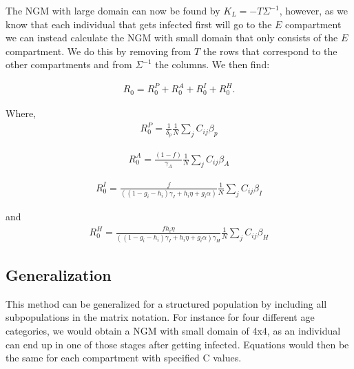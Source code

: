 \documentclass{article}
\begin{document}
The NGM with large domain can now be found by $K_L = - T \Sigma^{-1}$, however, as we know that each individual that gets infected first will go to the $E$ compartment we can instead calculate the NGM with small domain that only consists of the $E$ compartment.
We do this by removing from $T$ the rows that correspond to the other compartments and from $\Sigma^{-1}$ the columns. 
We then find: 

\begin{gather}
R_0 = R_0^P + R_0^A + R_0^I + R_0^H.  
\end{gather}

Where, 
\begin{gather}
R_0^P = \frac{1}{\delta_p} \frac{1}{N} \sum_{j} C_{ij}\beta_p
\end{gather}

\begin{gather}
R_0^A = \frac{(1-f)}{\gamma_A} \frac{1}{N} \sum_{j} C_{ij}\beta_A
\end{gather}

\begin{gather}
R_0^I = \frac{f}{((1-g_i-h_i) \gamma_{I} + h_i \eta + g_i \alpha)} \frac{1}{N} \sum_{j} C_{ij}\beta_I
\end{gather}

and
\begin{gather}
R_0^H = \frac{fh_i \eta}{((1-g_i-h_i) \gamma_{I} + h_i \eta + g_i \alpha)\gamma_H} \frac{1}{N} \sum_{j} C_{ij}\beta_H
\end{gather}

\subsection*{Generalization}

This method can be generalized for a structured population by including all subpopulations in the matrix notation. For instance for four different age categories, we would obtain a NGM with small domain of 4x4, as an individual can end up in one of those stages after getting infected. Equations would then be the same for each compartment with specified C values. 
\end{document}

